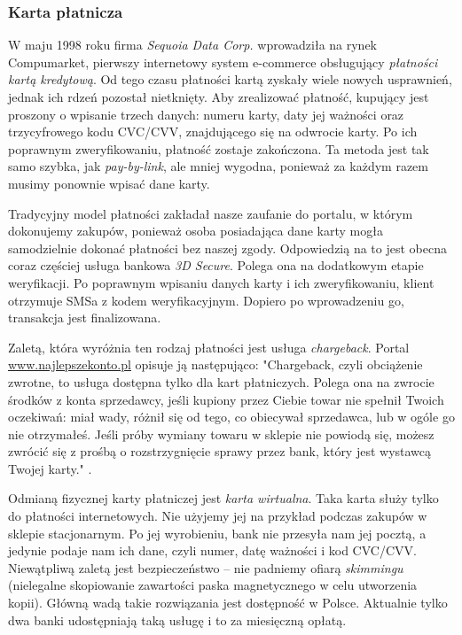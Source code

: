 \documentclass[12pt]{article}
\numberwithin{figure}{section}
\begin{document}
\begin{sloppypar}
\subsubsection{Karta płatnicza} \label{sec:cards}
W maju 1998 roku firma \textit{Sequoia Data Corp.} wprowadziła na rynek Compumarket, pierwszy internetowy system e-commerce obsługujący \textit{płatności kartą kredytową}. Od tego czasu płatności kartą zyskały wiele nowych usprawnień, jednak ich rdzeń pozostał nietknięty. Aby zrealizować płatność, kupujący jest proszony o wpisanie trzech danych: numeru karty, daty jej ważności oraz trzycyfrowego kodu CVC/CVV, znajdującego się na odwrocie karty. Po ich poprawnym zweryfikowaniu, płatność zostaje zakończona. Ta metoda jest tak samo szybka, jak \textit{pay-by-link}, ale mniej wygodna, ponieważ za każdym razem musimy ponownie wpisać dane karty. 

Tradycyjny model płatności zakładał nasze zaufanie do portalu, w którym dokonujemy zakupów, ponieważ osoba posiadająca dane karty mogła samodzielnie dokonać płatności bez naszej zgody. Odpowiedzią na to jest obecna coraz częściej usługa bankowa \textit{3D Secure}. Polega ona na dodatkowym etapie weryfikacji. Po poprawnym wpisaniu danych karty i ich zweryfikowaniu, klient otrzymuje SMSa z kodem weryfikacyjnym. Dopiero po wprowadzeniu go, transakcja jest finalizowana.

Zaletą, która wyróżnia ten rodzaj płatności jest usługa \textit{chargeback}. Portal \url{www.najlepszekonto.pl} opisuje ją następująco: "Chargeback, czyli obciążenie zwrotne, to usługa dostępna tylko dla kart płatniczych. Polega ona na zwrocie środków z konta sprzedawcy, jeśli kupiony przez Ciebie towar nie spełnił Twoich oczekiwań: miał wady, różnił się od tego, co obiecywał sprzedawca, lub w ogóle go nie otrzymałeś. Jeśli próby wymiany towaru w sklepie nie powiodą się, możesz zwrócić się z prośbą o rozstrzygnięcie sprawy przez bank, który jest wystawcą Twojej karty." \cite{chargeback}.

Odmianą fizycznej karty płatniczej jest \textit{karta wirtualna}. Taka karta służy tylko do płatności internetowych. Nie użyjemy jej na przykład podczas zakupów w sklepie stacjonarnym. Po jej wyrobieniu, bank nie przesyła nam jej pocztą, a jedynie podaje nam ich dane, czyli numer, datę ważności i kod CVC/CVV. Niewątpliwą zaletą jest bezpieczeństwo -- nie padniemy ofiarą \textit{skimmingu} (nielegalne skopiowanie zawartości paska magnetycznego w celu utworzenia kopii). Główną wadą takie rozwiązania jest dostępność w Polsce. Aktualnie tylko dwa banki udostępniają taką usługę i to za miesięczną opłatą. 


\end{sloppypar}
\end{document}
